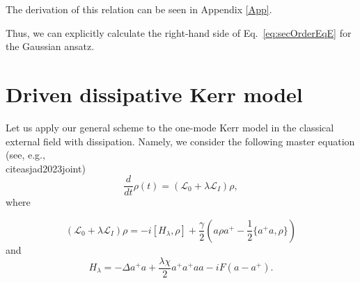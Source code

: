 \documentclass[12pt]{article}
\theoremstyle{definition}
\def\DE {\Delta}
\def\ga {\gamma}
\def\la {\lambda}
\begin{document}
	The derivation of this relation can be seen in Appendix \ref{App}.
	
	Thus, we can   explicitly calculate the right-hand side of Eq.~\eqref{eq:secOrderEqE} for the Gaussian ansatz.
	
	
	\section{\label{sec:ConsideredSystem}  Driven dissipative Kerr model}
	
	Let us apply our general scheme to the one-mode Kerr model in the classical external field with dissipation. Namely, we consider the following master equation  (see, e.g., \\cite{asjad2023joint})
	\begin{equation}
		\label{eq:EvEq}
		\dfrac{d}{dt}\rho(t) = (\mathcal{L}_0 + \lambda\mathcal{L}_I)\rho,
	\end{equation}
	where
	
	\begin{equation}
		\label{eq:FormOfL}
		(\mathcal{L}_0 + \lambda\mathcal{L}_I)\rho = -i[H_{\lambda},\rho] + \dfrac{\ga}{2}(a\rho a^+ - \dfrac12\{a^+a,\rho\})
	\end{equation}
	and
	\begin{equation}
		\label{eq:FormOfH}
		H_{\la} = -\DE a^+a + \dfrac{\la\chi}{2}a^+a^+aa - iF(a - a^+).
	\end{equation}
	
\end{document}
